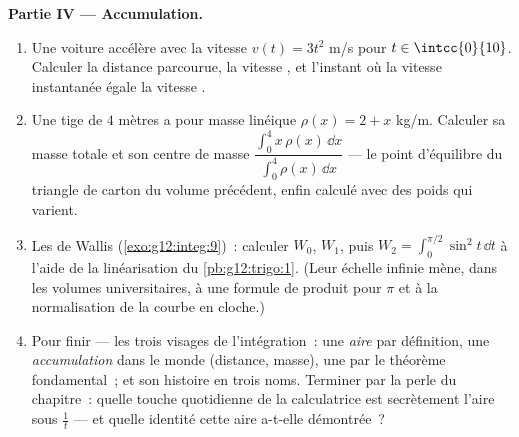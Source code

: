 \begin{problem}
\medskip
\noindent\textbf{Partie IV --- Accumulation.}
\begin{enumerate}[resume]
  \item Une voiture accélère avec la vitesse $v(t) = 3t^2$ m/s pour
        $t \in \intcc{0}{10}$. Calculer la distance parcourue, la
        vitesse , et l'instant où la vitesse instantanée
        égale la vitesse .
  \item Une tige de $4$ mètres a pour masse linéique
        $\rho(x) = 2 + x$ kg/m. Calculer sa masse totale et son
        centre de masse
        $\dfrac{\int_0^4 x\,\rho(x)\,\dd x}{\int_0^4
        \rho(x)\,\dd x}$ --- le point d'équilibre du triangle de
        carton du volume précédent, enfin calculé avec des poids qui
        varient.
  \item Les  de Wallis (\cref{exo:g12:integ:9})~:
        calculer $W_0$, $W_1$, puis
        $W_2 = \int_0^{\pi/2} \sin^2 t\,\dd t$ à l'aide de la
        linéarisation du \cref{pb:g12:trigo:1}. (Leur échelle
        infinie mène, dans les volumes universitaires, à une formule
        de produit pour $\pi$ et à la normalisation de la courbe en
        cloche.)
  \item Pour finir --- les trois visages de l'intégration~: une
        \emph{aire} par définition, une \emph{accumulation} dans le
        monde (distance, masse), une \emph{} par le
        théorème fondamental~; et son histoire en trois noms.
        Terminer par la perle du chapitre~: quelle touche
        quotidienne de la calculatrice est secrètement l'aire sous
        $\frac1t$ --- et quelle identité cette aire a-t-elle
        démontrée~?
\end{enumerate}
\end{problem}
